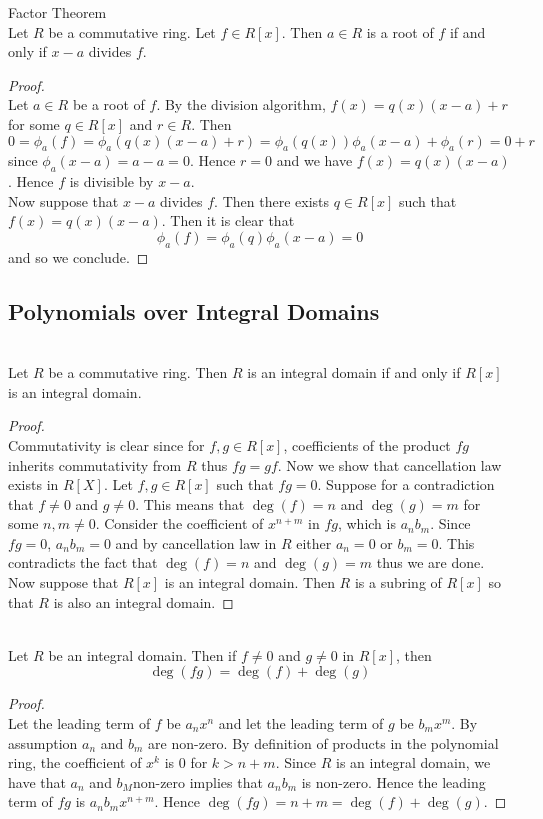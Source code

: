 \documentclass[a4paper]{article}
\begin{document}
\begin{thm}{Factor Theorem}{}\\
Let $R$ be a commutative ring. Let $f\in R[x]$. Then $a\in R$ is a root of $f$ if and only if $x-a$ divides $f$. 
\begin{proof}\\
Let $a\in R$ be a root of $f$. By the division algorithm, $f(x)=q(x)(x-a)+r$ for some $q\in R[x]$ and $r\in R$. Then $$0=\phi_a(f)=\phi_a(q(x)(x-a)+r)=\phi_a(q(x))\phi_a(x-a)+\phi_a(r)=0+r$$ since $\phi_a(x-a)=a-a=0$. Hence $r=0$ and we have $f(x)=q(x)(x-a)$. Hence $f$ is divisible by $x-a$. \\

Now suppose that $x-a$ divides $f$. Then there exists $q\in R[x]$ such that $f(x)=q(x)(x-a)$. Then it is clear that $$\phi_a(f)=\phi_a(q)\phi_a(x-a)=0$$ and so we conclude. 
\end{proof}
\end{thm}

\subsection{Polynomials over Integral Domains}
\begin{prp}{}{}\\
Let $R$ be a commutative ring. Then $R$ is an integral domain if and only if $R[x]$ is an integral domain. 
\begin{proof}\\
Commutativity is clear since for $f,g\in R[x]$, coefficients of the product $fg$ inherits commutativity from $R$ thus $fg=gf$. Now we show that cancellation law exists in $R[X]$. Let $f,g\in R[x]$ such that $fg=0$. Suppose for a contradiction that $f\neq 0$ and $g\neq 0$. This means that $\deg(f)=n$ and $\deg(g)=m$ for some $n,m\neq 0$. Consider the coefficient of $x^{n+m}$ in $fg$, which is $a_nb_m$. Since $fg=0$, $a_nb_m=0$ and by cancellation law in $R$ either $a_n=0$ or $b_m=0$. This contradicts the fact that $\deg(f)=n$ and $\deg(g)=m$ thus we are done. \\

Now suppose that $R[x]$ is an integral domain. Then $R$ is a subring of $R[x]$ so that $R$ is also an integral domain. 
\end{proof}
\end{prp}

\begin{prp}{}{}\\
Let $R$ be an integral domain. Then if $f\neq 0$ and $g\neq 0$ in $R[x]$, then $$\deg(fg)=\deg(f)+\deg(g)$$
\begin{proof}\\
Let the leading term of $f$ be $a_nx^n$ and let the leading term of $g$ be $b_mx^m$. By assumption $a_n$ and $b_m$ are non-zero. By definition of products in the polynomial ring, the coefficient of $x^k$ is $0$ for $k>n+m$. Since $R$ is an integral domain, we have that $a_n$ and $b_M$non-zero implies that $a_nb_m$ is non-zero. Hence the leading term of $fg$ is $a_nb_mx^{n+m}$. Hence $\deg(fg)=n+m=\deg(f)+\deg(g)$. 
\end{proof}
\end{prp}
\end{document}
